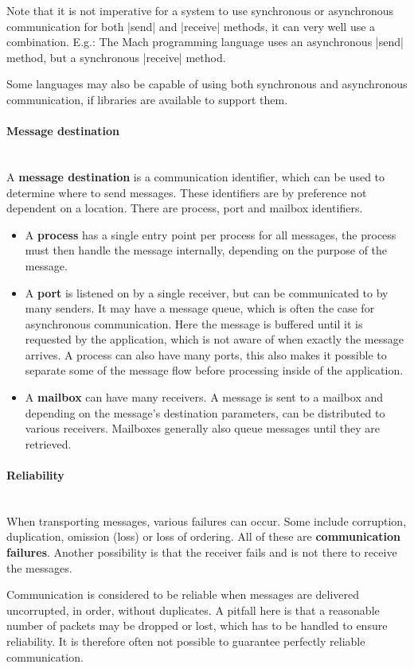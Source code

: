 \documentclass[a4paper]{article}
\newcommand{\subsubsubsection}[1]{\paragraph{#1}\mbox{}\\}
\begin{document}
Note that it is not imperative for a system to use synchronous or asynchronous communication for both |send| and |receive| methods, it can very well use a combination. E.g.: The Mach programming language uses an asynchronous |send| method, but a synchronous |receive| method.

Some languages may also be capable of using both synchronous and asynchronous communication, if libraries are available to support them.

\subsubsubsection{Message destination}

A \textbf{message destination} is a communication identifier, which can be used to determine where to send messages. These identifiers are by preference not dependent on a location. There are process, port and mailbox identifiers.

\begin{itemize}
\item A \textbf{process} has a single entry point per process for all messages, the process must then handle the message internally, depending on the purpose of the message.
\item A \textbf{port} is listened on by a single receiver, but can be communicated to by many senders. It may have a message queue, which is often the case for asynchronous communication. Here the message is buffered until it is requested by the application, which is not aware of when exactly the message arrives. A process can also have many ports, this also makes it possible to separate some of the message flow before processing inside of the application.
\item A \textbf{mailbox} can have many receivers. A message is sent to a mailbox and depending on the message's destination parameters, can be distributed to various receivers. Mailboxes generally also queue messages until they are retrieved.
\end{itemize}

\subsubsubsection{Reliability}

When transporting messages, various failures can occur. Some include corruption, duplication, omission (loss) or loss of ordering. All of these are \textbf{communication failures}. Another possibility is that the receiver fails and is not there to receive the messages.

Communication is considered to be reliable when messages are delivered uncorrupted, in order, without duplicates. A pitfall here is that a reasonable number of packets may be dropped or lost, which has to be handled to ensure reliability. It is therefore often not possible to guarantee perfectly reliable communication.
\end{document}
